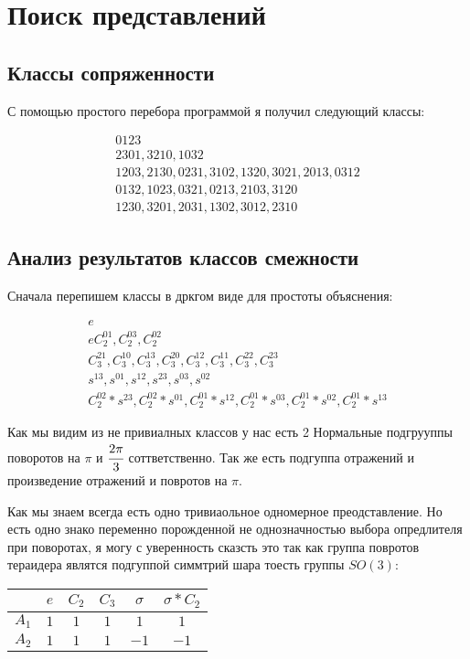 \section{Поиcк представлений}

\subsection{Классы сопряженности}

С помощью простого перебора программой я получил следующий классы:

\begin{eqnarray}
    0123\\
    2301, 3210, 1032\\
    1203, 2130, 0231, 3102, 1320, 3021, 2013, 0312\\
    0132, 1023, 0321, 0213, 2103, 3120\\
    1230, 3201, 2031, 1302, 3012, 2310
\end{eqnarray}

\subsection{Анализ результатов классов смежности}

Сначала перепишем классы в дркгом виде для простоты объяснения:

\begin{eqnarray}
    e\\e
    C^{01}_2, C^{03}_2, C^{02}_2\\
    C^{21}_3, C^{10}_3, C^{13}_3, C^{20}_3, C^{12}_3, C^{11}_3, C^{22}_3, C^{23}_3\\
    s^{13}, s^{01}, s^{12}, s^{23}, s^{03}, s^{02}\\
    C^{02}_2*s^{23}, C^{02}_2*s^{01}, C^{01}_2*s^{12}, C^{01}_2*s^{03}, C^{01}_2*s^{02}, C^{01}_2*s^{13}
\end{eqnarray}

Как мы видим из не привиалных классов у нас есть 2 Нормальные подгрууппы поворотов
на $\pi$ и $\cfrac{2\pi}{3}$ соттветственно. Так же есть подгуппа отражений
и произведение отражений и повротов на $\pi$.

Как мы знаем всегда есть одно тривиаольное одномерное преодставление.
Но есть одно знако переменно порожденной не однозначностью выбора опредлителя
при поворотах, я могу с уверенность сказсть это так как группа повротов 
тераидера являтся подгуппой симмтрий шара тоесть группы $SO(3)$:


\begin{tabular}[pos]{c|c|c|c|c|c}
            & $e$ & $C_2$   & $C_3$ & $\sigma$  & $\sigma*C_2$  \\ \hline
    $A_1$   & $1$ & $1$     & $1$   & $1$       & $1$           \\ \hline
    $A_2$   & $1$ & $1$     & $1$   & $-1$      & $-1$          
\end{tabular}

